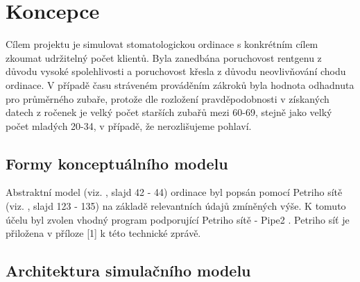\documentclass[a4paper,11pt,titlepage]{article}
\begin{document}
\section{Koncepce}

Cílem projektu je simulovat stomatologickou ordinace s konkrétním cílem zkoumat udržitelný počet klientů. Byla zanedbána poruchovost rentgenu z důvodu vysoké spolehlivosti a poruchovost křesla z důvodu neovlivňování chodu ordinace. V případě času stráveném prováděním zákroků byla hodnota odhadnuta pro průměrného zubaře, protože dle rozložení pravděpodobnosti v získaných datech z ročenek \cite{ceskastomatologickakomorarocenky} je velký počet starších zubařů mezi 60-69, stejně jako velký počet mladých 20-34, v případě, že nerozlišujeme pohlaví.

\subsection{Formy konceptuálního modelu}

Abstraktní model (viz. \cite{ims}, slajd 42 - 44) ordinace byl popsán pomocí Petriho sítě (viz. \cite{ims}, slajd 123 - 135) na základě relevantních údajů zmíněných výše. K tomuto účelu byl zvolen vhodný program podporující Petriho sítě - Pipe2 \cite{pipe2}. Petriho síť je přiložena v příloze [1] k této technické zprávě.

\subsection{Architektura simulačního modelu}
\end{document}

